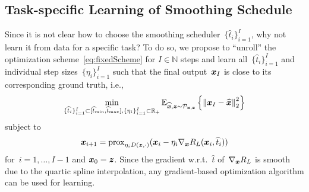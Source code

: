 \documentclass{article}
\newcommand{\N}{\mathbb{N}}
\newcommand{\X}{\mathcal{X}}
\newcommand{\norm}[1]{\left\Vert#1\right\Vert}
\newcommand{\prox}{\mathrm{prox}}
\def\hatt{{\widehat{t}}}
\newcommand{\tminh}{\hatt_\mathrm{min}}
\newcommand{\tmaxh}{\hatt_\mathrm{max}}
\newcommand{\dist}[1]{\mathcal{P}_{#1}}
\theoremstyle{plain}
\theoremstyle{definition}
\theoremstyle{remark}
\begin{document}

\subsection{Task-specific Learning of Smoothing Schedule} \label{sec:learnedVN}
Since it is not clear how to choose the smoothing scheduler~$\{\hatt_i\}_{i=1}^I$, why not learn it from data for a specific task?
To do so, we propose to ``unroll'' the optimization scheme~\eqref{eq:fixedScheme} for $I\in\N$ steps and learn all~$\{\hatt_i\}_{i=1}^I$ and individual step sizes~$\{\eta_i\}_{i=1}^I$ such that the final output~${\bm{x}}_I$ is close to its corresponding ground truth, i.e.,
\[
\min_{\{\hatt_i\}_{i=1}^I\subset[\tminh,\tmaxh],\{\eta_i\}_{i=1}^I\subset\R_+} \E_{\widehat{\vx},\vz\sim\dist{\rvx,\rvz}} \left\{\norm{\vx_I-\widehat{\vx}}_2^2\right\}
\]
subject to
\[
\vx_{i+1} = \prox_{\eta_i D(\vz,\cdot)}(\vx_i-\eta_i \nabla_\vx R_L(\vx_i,\hatt_i))
\]
for~$i=1,\ldots,I-1$ and ${\bm{x}}_0={\bm{z}}$. 
Since the gradient w.r.t.~$\hatt$ of~$\nabla_{\bm{x}} R_L$ is smooth due to the quartic spline interpolation, any gradient-based optimization algorithm can be used for learning.
\end{document}
